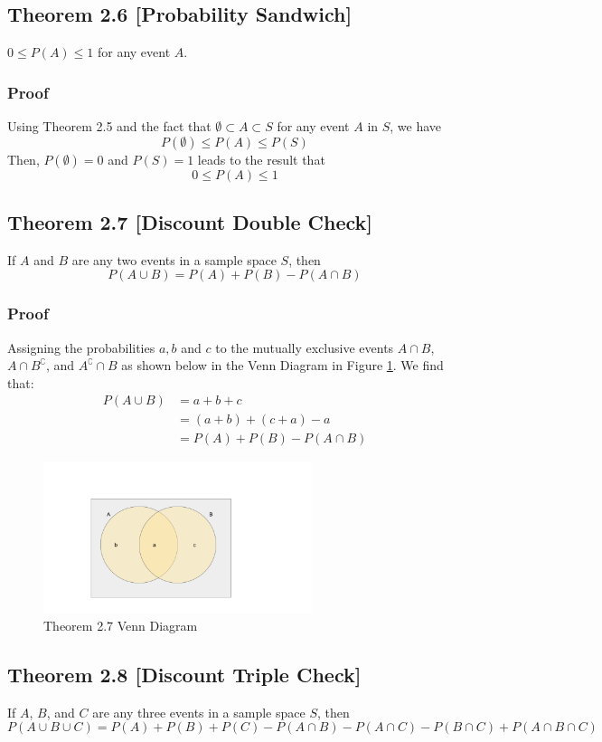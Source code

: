 \documentclass{article}
\begin{document}
\subsection*{Theorem 2.6 [Probability Sandwich]}
\(0 \le P(A) \le 1\) for any event \(A\).

\subsubsection*{Proof}
Using Theorem 2.5 and the fact that \(\emptyset \subset A \subset S\) for any event \(A\) in \(S\), we have 
\[
P(\emptyset) \le P(A) \le P(S)
\]
Then, \(P(\emptyset)=0\) and \(P(S)=1\) leads to the result that 
\[
0 \le P(A) \le 1
\]

\subsection*{Theorem 2.7 [Discount Double Check]}
If \(A\) and \(B\) are any two events in a sample space \(S\), then 
\[
P(A \cup B) = P(A) + P(B) - P(A \cap B)
\]

\subsubsection*{Proof}
Assigning the probabilities \(a, b\) and \(c\) to the mutually exclusive events \(A \cap B\), \(A \cap B^\complement \), and \(A^\complement \cap B\) as shown below in the Venn Diagram in Figure \ref{fig:Venn2.7}. We find that:
\begin{align*}
P(A \cup B) &= a+b+c\\
&=(a+b)+(c+a)-a\\
&=P(A) + P(B) - P(A \cap B)
\end{align*}
\begin{figure}
\includegraphics[width=0.7\textwidth]{Theorem_2_7_Venn}
\caption{Theorem 2.7 Venn Diagram}
\label{fig:Venn2.7}
\end{figure}

\newpage
\subsection*{Theorem 2.8 [Discount Triple Check]}
If \(A\), \(B\), and \(C\) are any three events in a sample space \(S\), then
\[
P(A \cup B \cup C) = P(A) + P(B) + P(C) - P(A \cap B) - P(A \cap C) - P(B \cap C) + P(A \cap B \cap C)
\]
\end{document}
